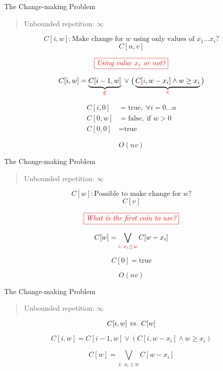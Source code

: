 \begin{frame}{}
  \begin{exampleblock}{The Change-making Problem}
    \begin{quote}
      \centering
      Unbounded repetition: $\infty$
    \end{quote}
  \end{exampleblock}

  \pause
  \[
    C[i, w]: \text{Make change for $w$ using only values of $x_{1} \dots x_{i}$?}
  \]
  \[
    C[n,v]
  \]

  \pause
  \[
    \textcolor{red}{\fbox{\it Using value $x_{i}$ or not?}}
  \]

  \pause
  \[
    C[i,w] = \underbrace{C[i-1, w]}_{\textcolor{red}{\notin}} \;\lor\; \big(\underbrace{C[\textcolor{red}{i}, w-x_{i}] \land w \ge x_{i}}_{\textcolor{red}{\in}}\big)
  \]

  \pause
  \begin{align*}
    C[i,0] &= \text{true}, \; \forall i = 0 \dots n  \\
    C[0,w] &= \text{false}, \; \text{if } w > 0 \\
    C[0,0] &= \text{true}
  \end{align*}
  
  \[
    O(nv)
  \]
\end{frame}

\begin{frame}{}
  \begin{exampleblock}{The Change-making Problem}
    \begin{quote}
      \centering
      Unbounded repetition: $\infty$
    \end{quote}
  \end{exampleblock}

  \pause
  \[
    C[w]: \text{Possible to make change for $w$?}
  \]
  \[
    C[v]
  \]

  \pause
  \[
    \textcolor{red}{\fbox{\it What is the first coin to use?}}
  \]
  
  \pause
  \[
    C[w] = \bigvee_{\textcolor{red}{i: \; x_i \le w}} C[w-x_i]
  \]

  \pause
  \[
    C[0] = \text{true}
  \]

  \pause
  \[
    O(nv)
  \]
\end{frame}

\begin{frame}{}
  \begin{exampleblock}{The Change-making Problem}
    \begin{quote}
      \centering
      Unbounded repetition: $\infty$
    \end{quote}
  \end{exampleblock}

  \[
    C[i,w] \text{\emph{ vs. }} C[w]
  \]

  \[
    C[i,w] = C[i-1, w] \lor (C[i, w-x_{i}] \land w \ge x_{i})
  \]

  \[
    C[w] = \bigvee_{i: \; x_i \le w} C[w-x_i]
  \]
\end{frame}

